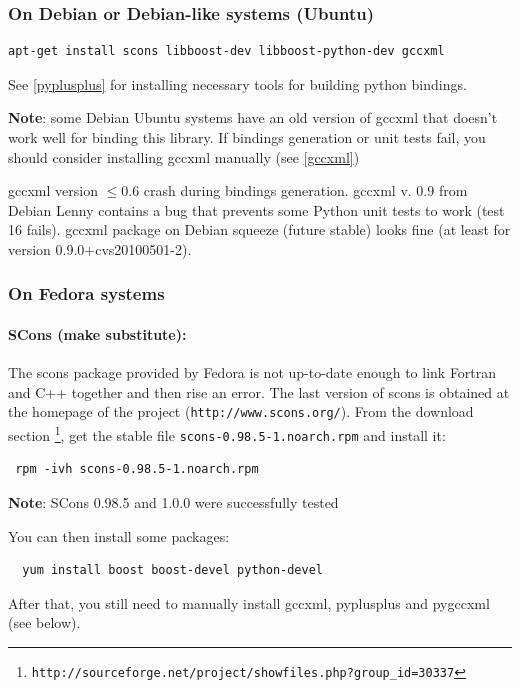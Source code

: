 \documentclass[12pt,a4paper]{article}
\begin{document}
\subsubsection{On Debian or Debian-like systems (Ubuntu)}

\begin{verbatim}
apt-get install scons libboost-dev libboost-python-dev gccxml
\end{verbatim}
%
See \ref{pyplusplus} for installing necessary tools for building python bindings.


\textbf{Note}: some Debian Ubuntu systems have an old version of gccxml that doesn't work well for binding this
library. If bindings generation or unit tests fail, you should consider installing gccxml manually (see \ref{gccxml})

gccxml version $\le 0.6$ crash during bindings generation. gccxml v. $0.9$ from Debian Lenny contains a bug that prevents some Python unit tests to work (test 16 fails).
gccxml package on Debian squeeze (future stable) looks fine (at least for version 0.9.0+cvs20100501-2).


\subsubsection{On Fedora systems}

\paragraph{SCons (make substitute):}
The scons package provided by Fedora is not up-to-date enough to link Fortran and C++ together and then rise an
error. The last version of scons is obtained at the homepage of the project ({\tt  http://www.scons.org/}).
From the download section \footnote{\tt http://sourceforge.net/project/showfiles.php?group\_id=30337}, 
get the stable file {\tt scons-0.98.5-1.noarch.rpm} and install it:

\begin{verbatim}
 rpm -ivh scons-0.98.5-1.noarch.rpm
\end{verbatim}

\textbf{Note}: SCons 0.98.5 and 1.0.0 were successfully tested


You can then install some packages:

\begin{verbatim}
  yum install boost boost-devel python-devel
\end{verbatim}


After that, you still need to manually install gccxml, pyplusplus and pygccxml (see below).
\end{document}
